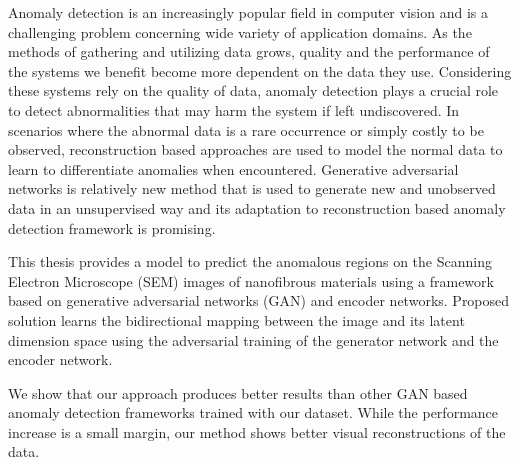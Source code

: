 
\begingroup

Anomaly detection is an increasingly popular field in computer vision and is a challenging 
problem concerning wide variety of application domains. As the methods of gathering and utilizing 
data grows, quality and the performance of the systems we benefit become
more dependent on the data they use. Considering these systems rely on the quality of data, 
anomaly detection plays a crucial role to detect abnormalities that may harm the system if 
left undiscovered. In scenarios where the abnormal data is a rare occurrence or simply costly 
to be observed, reconstruction based approaches are used to model the normal data to learn to 
differentiate anomalies when encountered. Generative adversarial networks is relatively new method 
that is used to generate new and unobserved data in an unsupervised way and 
its adaptation to reconstruction based anomaly detection framework is promising.

This thesis provides a model to predict the anomalous regions on the Scanning Electron Microscope 
(SEM) images of nanofibrous materials using a framework based on generative adversarial networks 
(GAN) and encoder networks. Proposed solution learns the bidirectional mapping between the image 
and its latent dimension space using the adversarial training of the generator network and the 
encoder network. 

We show that our approach produces better results than other GAN based anomaly detection frameworks 
trained with our dataset. While the performance increase is a small margin, our method shows better 
visual reconstructions of the data.
\endgroup